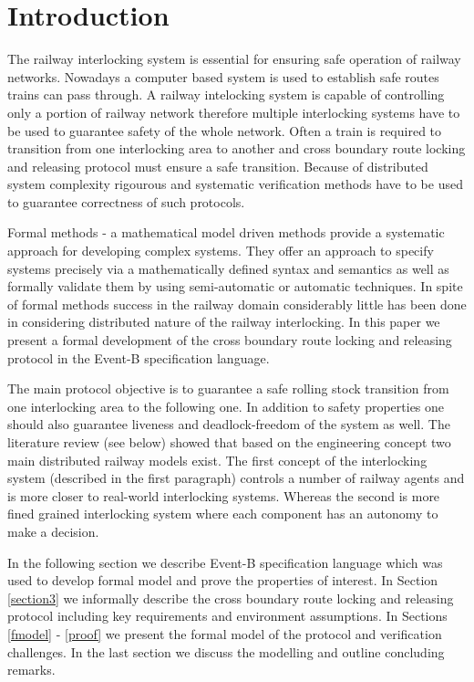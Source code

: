 \section{Introduction}
The railway interlocking system is essential for ensuring safe operation of railway networks. Nowadays a computer based system is used to establish safe routes trains can pass through. A railway intelocking system is capable of controlling only a portion of railway network therefore multiple interlocking systems have to be used to guarantee safety of the whole network. Often a train is required to transition from one interlocking area to another and cross boundary route locking and releasing protocol must ensure a safe transition. Because of distributed system complexity rigourous and systematic verification methods have to be used to guarantee correctness of such protocols.

Formal methods - a mathematical model driven methods provide a systematic approach for developing complex systems. They offer an approach to specify systems precisely via a mathematically defined syntax and semantics as well as formally validate them by using semi-automatic or automatic techniques. In spite of formal methods success in the railway domain considerably little has been done in considering distributed nature of the railway interlocking. In this paper we present a formal development of the cross boundary route locking and releasing protocol in the Event-B \cite{EventBBook} specification language. 

The main protocol objective is to guarantee a safe rolling stock transition from one interlocking area to the following one. In addition to safety properties one should also guarantee liveness and deadlock-freedom of the system as well. The literature review (see below) showed that based on the engineering concept two main distributed railway models exist. The first concept of the interlocking system (described in the first paragraph) controls a number of railway agents and is more closer to real-world interlocking systems. Whereas the second is more fined grained interlocking system where each component has an autonomy to make a decision. %


In the following section we describe Event-B specification language which was used to develop formal model and prove the properties of interest. In Section \ref{section3} we informally describe the cross boundary route locking and releasing protocol including key requirements and environment assumptions. In Sections \ref{fmodel} - \ref{proof} we present the formal model of the protocol and verification challenges. In the last section we discuss the modelling and outline concluding remarks. \\


